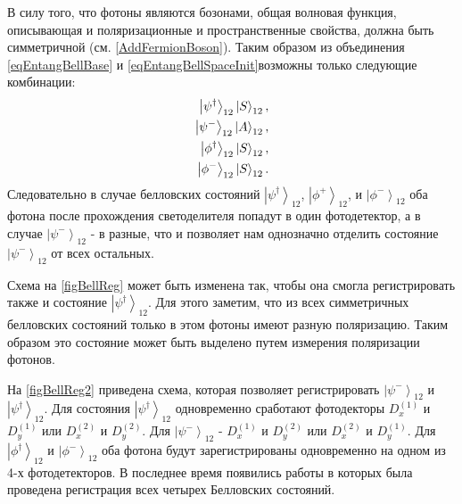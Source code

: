 В силу того, что фотоны являются бозонами, 
общая волновая функция,
описывающая и поляризационные и пространственные свойства,
должна быть симметричной \cite{bFeinman}
(см. \autoref{AddFermionBoson}). Таким образом из объединения 
\eqref{eqEntangBellBase} и \eqref{eqEntangBellSpaceInit}возможны
только следующие комбинации:
\begin{eqnarray}
\left|\psi^{\dag}\right>_{12}\ket{S}_{12},
\nonumber \\ 
\left|\psi^{-}\right>_{12}\ket{A}_{12}, 
\nonumber \\ 
\left|\phi^{\dag}\right>_{12}\ket{S}_{12}, 
\nonumber \\ 
\left|\phi^{-}\right>_{12}\ket{S}_{12}.
\nonumber
\end{eqnarray}
Следовательно в случае белловских состояний 
$\left|\psi^{\dag}\right>_{12}$, $\left|\phi^{+}\right>_{12}$, и
$\left|\phi^{-}\right>_{12}$ оба фотона после прохождения
светоделителя попадут в один фотодетектор, а в случае
$\left|\psi^{-}\right>_{12}$ - в разные, что и позволяет нам
однозначно отделить состояние $\left|\psi^{-}\right>_{12}$ от всех
остальных. 



Схема на \autoref{figBellReg} может быть изменена так, чтобы она
смогла регистрировать также и состояние
$\left|\psi^{\dag}\right>_{12}$. Для этого заметим, что из всех
симметричных белловских состояний только в этом фотоны имеют разную
поляризацию. Таким образом это состояние может быть выделено путем
измерения поляризации фотонов.

На \autoref{figBellReg2} приведена схема, которая позволяет
регистрировать $\left|\psi^{-}\right>_{12}$ и
$\left|\psi^{\dag}\right>_{12}$. Для состояния
$\left|\psi^{\dag}\right>_{12}$ одновременно сработают фотодекторы 
$D^{(1)}_x$ и $D^{(1)}_y$ или $D^{(2)}_x$ и $D^{(2)}_y$. Для
$\left|\psi^{-}\right>_{12}$ - $D^{(1)}_x$ и $D^{(2)}_y$ или
$D^{(2)}_x$ и $D^{(1)}_y$. Для $\left|\phi^{\dag}\right>_{12}$ и
$\left|\phi^{-}\right>_{12}$ оба фотона будут зарегистрированы
одновременно на одном из 4-х фотодетекторов. В последнее время
появились работы \cite{bKulik} в которых была проведена регистрация
всех четырех Белловских состояний.
